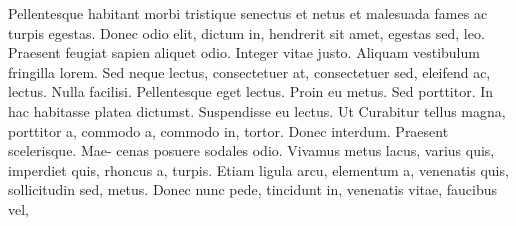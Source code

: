 \documentclass[AMS,STIX2COL]{WileyNJD-v2}
\begin{document}
    Pellentesque habitant morbi tristique senectus et netus et malesuada fames ac turpis egestas. Donec odio elit,
    dictum in, hendrerit sit amet, egestas sed, leo. Praesent feugiat sapien aliquet odio. Integer vitae justo. Aliquam
    vestibulum fringilla lorem. Sed neque lectus, consectetuer at, consectetuer sed, eleifend ac, lectus. Nulla facilisi.
    Pellentesque eget lectus. Proin eu metus. Sed porttitor. In hac habitasse platea dictumst. Suspendisse eu lectus. Ut Curabitur tellus magna, porttitor a, commodo a, commodo in, tortor. Donec interdum. Praesent scelerisque. Mae-
    cenas posuere sodales odio. Vivamus metus lacus, varius quis, imperdiet quis, rhoncus a, turpis. Etiam ligula arcu,
    elementum a, venenatis quis, sollicitudin sed, metus. Donec nunc pede, tincidunt in, venenatis vitae, faucibus vel,
\end{document}
